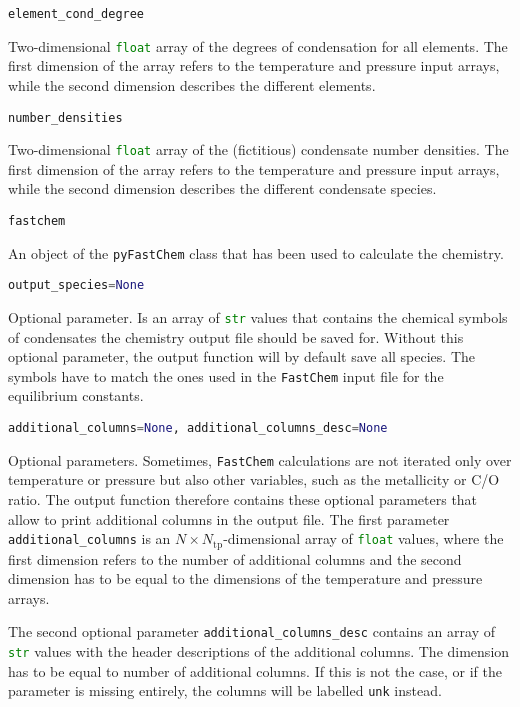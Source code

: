 \documentclass[numbers=noenddot]{aux/fcmanual}
\newcommand{\fc}{\texttt{FastChem}\xspace}
\newcommand{\pfc}{\texttt{pyFastChem}\xspace}
\begin{document}
\bigbreak

\lstinline[language=Python]!element_cond_degree!
\begin{addmargin}[25pt]{0pt}
	Two-dimensional \lstinline[language=Python]!float! array of the degrees of condensation for all elements. The first dimension of the array refers to the temperature and pressure input arrays, while the second dimension describes the different elements.
\end{addmargin}

\bigbreak

\lstinline[language=Python]!number_densities!
\begin{addmargin}[25pt]{0pt}
	Two-dimensional \lstinline[language=Python]!float! array of the (fictitious) condensate number densities. The first dimension of the array refers to the temperature and pressure input arrays, while the second dimension describes the different condensate species.
\end{addmargin}


\bigbreak

\lstinline[language=Python]!fastchem!
\begin{addmargin}[25pt]{0pt}
	An object of the \pfc class that has been used to calculate the chemistry. 
\end{addmargin}


\bigbreak

\lstinline[language=Python]!output_species=None!
\begin{addmargin}[25pt]{0pt}
	Optional parameter. Is an array of \lstinline[language=Python]!str! values that contains the chemical symbols of condensates the chemistry output file should be saved for. Without this optional parameter, the output function will by default save all species. The symbols have to match the ones used in the \fc input file for the equilibrium constants.
\end{addmargin}

\bigbreak

\lstinline[language=Python]!additional_columns=None, additional_columns_desc=None!
\begin{addmargin}[25pt]{0pt}
	Optional parameters. Sometimes, \fc calculations are not iterated only over temperature or pressure but also other variables, such as the metallicity or C/O ratio. The output function therefore contains these optional parameters that allow to print additional columns in the output file. The first parameter \lstinline[language=Python]!additional_columns! is an $N\times N_\mathrm{tp}$-dimensional array of \lstinline[language=Python]!float! values, where the first dimension refers to the number of additional columns and the second dimension has to be equal to the dimensions of the temperature and pressure arrays. 
	
	The second optional parameter \lstinline[language=Python]!additional_columns_desc! contains an array of \lstinline[language=Python]!str! values with the header descriptions of the additional columns. The dimension has to be equal to number of additional columns. If this is not the case, or if the parameter is missing entirely, the columns will be labelled \texttt{unk} instead.
\end{addmargin}
\end{document}
